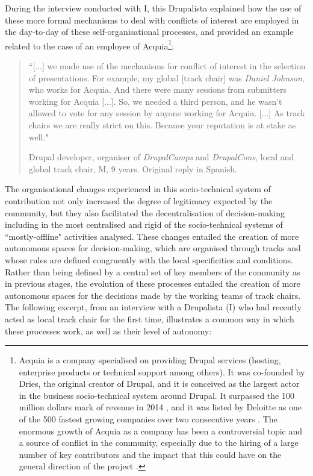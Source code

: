 During the interview conducted with I, this Drupalista explained how the use of these more formal mechanisms to deal with conflicts of interest are employed in the day-to-day of these self-organisational processes, and provided an example related to the case of an employee of Acquia\footnote{Acquia is a company specialised on providing Drupal services (hosting, enterprise products or technical support among others). It was co-founded by Dries, the original creator of Drupal, and it is conceived as the largest actor in the business socio-technical system around Drupal. It surpassed the 100 million dollars mark of revenue in 2014 \parencite{acquia-revenue:2016:Online}, and it was listed by Deloitte as one of the 500 fastest growing companies over two consecutive years \parencite{acquia-500:2016:Online}. The enormous growth of Acquia as a company has been a controversial topic and a source of conflict in the community, especially due to the hiring of a large number of key contributors and the impact that this could have on the general direction of the project \parencite[e.g.][]{acquia-influence01:2016:Online, acquia-influence02:2016:Online}.};

\begin{quotation}
``[...] we made use of the mechanisms for conflict of interest in the selection of presentations. For example, my global [track chair] was \textit{Daniel Johnson}, who works for Acquia. And there were many sessions from submitters working for Acquia [...]. So, we needed a third person, and he wasn't allowed to vote for any session by anyone working for Acquia. [...] As track chairs we are really strict on this. Because your reputation is at stake as well."

\begin{flushright}\footnotesize{Drupal developer, organiser of \textit{DrupalCamps} and \textit{DrupalCons}, local and global track chair, M, 9 years. Original reply in Spanish.}\end{flushright}
\end{quotation}

The organisational changes experienced in this socio-technical system of contribution not only increased the degree of legitimacy expected by the community, but they also facilitated the decentralisation of decision-making including in the most centralised and rigid of the socio-technical systems of ``mostly-offline" activities analysed. These changes entailed the creation of more autonomous spaces for decision-making, which are organised through tracks and whose rules are defined congruently with the local specificities and conditions. Rather than being defined by a central set of key members of the community as in previous stages, the evolution of these processes entailed the creation of more autonomous spaces for the decisions made by the working teams of track chairs. The following excerpt, from an interview with a Drupalista (I) who had recently acted as local track chair for the first time, illustrates a common way in which these processes work, as well as their level of autonomy:

